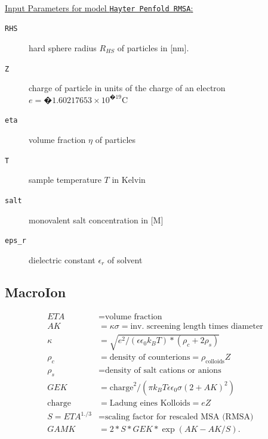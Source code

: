 \hspace{1pt}\\
\underline{Input Parameters for model \texttt{Hayter Penfold RMSA}:}\\
\begin{description}
\item[\texttt{RHS}] hard sphere radius $R_{HS}$ of particles in [nm].
\item[\texttt{Z}] charge of particle in units of the charge of an electron $e=�1.602 176 53 \times 10^{�19} \mathrm{C}$
\item[\texttt{eta}] volume fraction $\eta$ of particles
\item[\texttt{T}] sample temperature $T$ in Kelvin
\item[\texttt{salt}] monovalent salt concentration in [M]
\item[\texttt{eps\_r}] dielectric constant $\epsilon_r$ of solvent
\end{description}



\clearpage
\subsection{MacroIon}

\begin{subequations}
\begin{align}
ETA &= \text{volume fraction} \\
AK &= \kappa \sigma = \text{inv. screening length times diameter} \\
\kappa &=\sqrt{ e^2/(\epsilon \epsilon_0 k_B T)*(\rho_c+2 \rho_s) }\\
\rho_c &= \text{density of counterions} = \rho_\text{colloids} Z \\
\rho_s &= \text{density of salt cations or anions} \\
GEK &=\text{charge}^2/( \pi k_B T \epsilon \epsilon_0 \sigma (2+AK)^2)\\
\text{charge} &= \text{Ladung eines Kolloids} = e Z\\
S=ETA^{1./3} &= \text{scaling factor for rescaled MSA (RMSA)}\\
GAMK&=2*S*GEK*\exp(AK-AK/S).
\end{align}
\end{subequations}

